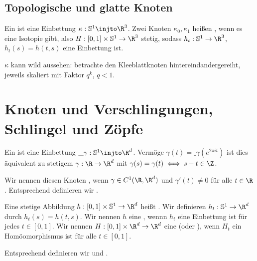\subsection{Topologische und glatte Knoten}

\begin{df}
    Ein  ist eine Einbettung $\kappa: \S^1 \injto \R^3$.
    Zwei Knoten $\kappa_0, \kappa_1$ heißen , wenn es eine Isotopie gibt, also $H: [0,1] \times \S^1 \to \R^3$ stetig, sodass $h_t: \S^1 \to \R^3$, $h_t(s) = h(t,s)$ eine Einbettung ist.
\end{df}

\begin{note}
    $\kappa$ kann wild aussehen: betrachte den Kleeblattknoten hintereindandergereiht, jeweils skaliert mit Faktor $q^k$, $q < 1$.
\end{note}



\section{Knoten und Verschlingungen, Schlingel und Zöpfe}

\begin{df}
    Ein  ist eine Einbettung $\_\gamma: \S^1 \injto \R^d$.
    Vermöge $\gamma(t) = \_\gamma(e^{2\pi i t})$ ist dies äquivalent zu stetigem $\gamma: \R \to \R^d$ mit $\gamma(s) = \gamma(t) \iff s - t \in \Z$.

    Wir nennen diesen Knoten , wenn $\gamma \in C^1(\R, \R^d)$ und $\gamma'(t) \neq 0$ für alle $t \in \R$.
    Entsprechend definieren wir .
\end{df}

\begin{df}
    Eine stetige Abbildung $h: [0,1] \times \S^1 \to \R^d$ heißt .
    Wir definieren $h_t: \S^1 \to \R^d$ durch $h_t(s) = h(t,s)$.
    Wir nennen $h$ eine , wennn $h_t$ eine Einbettung ist für jedes $t \in [0,1]$.
    Wir nennen $H: [0,1] \times \R^d \to \R^d$ eine  (oder ), wenn $H_t$ ein Homöomorphismus ist für alle $t \in [0,1]$.

    Entsprechend definieren wir  und .
\end{df}

